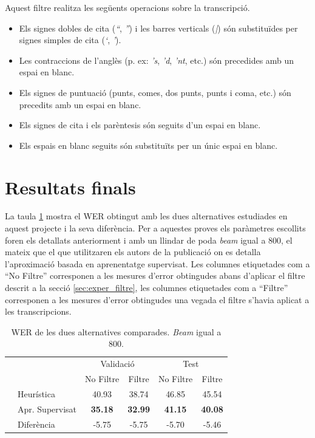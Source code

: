 Aquest filtre realitza les següents operacions sobre la transcripció.
\begin{itemize}
\item Els signes dobles de cita (\emph{``}, \emph{''}) i les barres verticals (\emph{|}) són substituïdes per signes simples de cita (\emph{`}, \emph{'}).
\item Les contraccions de l'anglès (p. ex: \emph{'s}, \emph{'d}, \emph{'nt}, etc.) són precedides amb un espai en blanc.
\item Els signes de puntuació (punts, comes, dos punts, punts i coma, etc.) són precedits amb un espai en blanc.
\item Els signes de cita i els parèntesis són seguits d'un espai en blanc.
\item Els espais en blanc seguits són substituïts per un únic espai en blanc.
\end{itemize}

\section{Resultats finals}
La taula \ref{tab:comp_prhlt_elirf} mostra el WER obtingut amb les dues alternatives estudiades en aquest projecte i la seva diferència. Per a aquestes proves els paràmetres escollits foren els detallats anteriorment i amb un llindar de poda \emph{beam} igual a 800, el mateix que el que utilitzaren els autors de la publicació on es detalla \mbox{l'aproximació} basada en aprenentatge supervisat. Les columnes etiquetades com a ``No Filtre'' corresponen a les mesures d'error obtingudes abans d'aplicar el filtre descrit a la secció \ref{sec:exper_filtre}, les columnes etiquetades com a ``Filtre'' corresponen a les mesures d'error obtingudes una vegada el filtre s'havia aplicat a les transcripcions.\\

\begin{table}
\begin{center}
\begin{tabular}{ll|c|c|c|c|}
\cline{3-6} & & \multicolumn{2}{c|}{Validació} & \multicolumn{2}{c|}{Test}\\
\cline{3-6} & & No Filtre & Filtre & No Filtre & Filtre\\
\cline{1-6} \multicolumn{1}{|l}{} & Heurística & 40.93 & 38.74 & 46.85 & 45.54\\ 
\cline{1-6} \multicolumn{1}{|l}{} & Apr. Supervisat & \textbf{35.18} & \textbf{32.99} & \textbf{41.15} & \textbf{40.08}\\ 
\cline{1-6} \multicolumn{1}{|l}{} & Diferència & -5.75 & -5.75 & -5.70 & -5.46 \\ 
\hline 
\end{tabular} 
\caption{WER de les dues alternatives comparades. \emph{Beam} igual a 800.}\label{tab:comp_prhlt_elirf}
\end{center}
\end{table}


